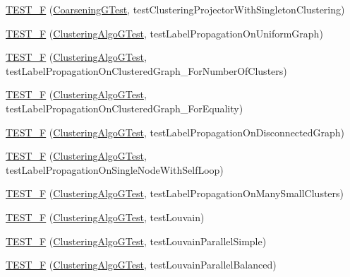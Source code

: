 \begin{DoxyCompactItemize}
\item 
\hyperlink{namespace_networ_kit_a0ae784520b38efeaf8ae258e06db0fbf}{T\-E\-S\-T\-\_\-\-F} (\hyperlink{class_networ_kit_1_1_coarsening_g_test}{Coarsening\-G\-Test}, test\-Clustering\-Projector\-With\-Singleton\-Clustering)
\item 
\hyperlink{namespace_networ_kit_ac88ca919fafae77b31d9701fe3fbf41f}{T\-E\-S\-T\-\_\-\-F} (\hyperlink{class_networ_kit_1_1_clustering_algo_g_test}{Clustering\-Algo\-G\-Test}, test\-Label\-Propagation\-On\-Uniform\-Graph)
\item 
\hyperlink{namespace_networ_kit_a7590ba53b3c7daa9d805db41b17d979e}{T\-E\-S\-T\-\_\-\-F} (\hyperlink{class_networ_kit_1_1_clustering_algo_g_test}{Clustering\-Algo\-G\-Test}, test\-Label\-Propagation\-On\-Clustered\-Graph\-\_\-\-For\-Number\-Of\-Clusters)
\item 
\hyperlink{namespace_networ_kit_a47440ebf4f9b819ed49f7d43584fcafa}{T\-E\-S\-T\-\_\-\-F} (\hyperlink{class_networ_kit_1_1_clustering_algo_g_test}{Clustering\-Algo\-G\-Test}, test\-Label\-Propagation\-On\-Clustered\-Graph\-\_\-\-For\-Equality)
\item 
\hyperlink{namespace_networ_kit_a2a306d74607ec520cad796ad6603f093}{T\-E\-S\-T\-\_\-\-F} (\hyperlink{class_networ_kit_1_1_clustering_algo_g_test}{Clustering\-Algo\-G\-Test}, test\-Label\-Propagation\-On\-Disconnected\-Graph)
\item 
\hyperlink{namespace_networ_kit_ab4a7126555e635ad80bb0f05a587b237}{T\-E\-S\-T\-\_\-\-F} (\hyperlink{class_networ_kit_1_1_clustering_algo_g_test}{Clustering\-Algo\-G\-Test}, test\-Label\-Propagation\-On\-Single\-Node\-With\-Self\-Loop)
\item 
\hyperlink{namespace_networ_kit_a87a47f3d8a91ea2de2890ab1a06303c2}{T\-E\-S\-T\-\_\-\-F} (\hyperlink{class_networ_kit_1_1_clustering_algo_g_test}{Clustering\-Algo\-G\-Test}, test\-Label\-Propagation\-On\-Many\-Small\-Clusters)
\item 
\hyperlink{namespace_networ_kit_a36b2e47c2b5111304a84cb487a660627}{T\-E\-S\-T\-\_\-\-F} (\hyperlink{class_networ_kit_1_1_clustering_algo_g_test}{Clustering\-Algo\-G\-Test}, test\-Louvain)
\item 
\hyperlink{namespace_networ_kit_a207fff0cd3cd77438f7cbe5aab6f9437}{T\-E\-S\-T\-\_\-\-F} (\hyperlink{class_networ_kit_1_1_clustering_algo_g_test}{Clustering\-Algo\-G\-Test}, test\-Louvain\-Parallel\-Simple)
\item 
\hyperlink{namespace_networ_kit_a255301f28ee0cc37ff098fc75e60c37b}{T\-E\-S\-T\-\_\-\-F} (\hyperlink{class_networ_kit_1_1_clustering_algo_g_test}{Clustering\-Algo\-G\-Test}, test\-Louvain\-Parallel\-Balanced)

\end{DoxyCompactItemize}
